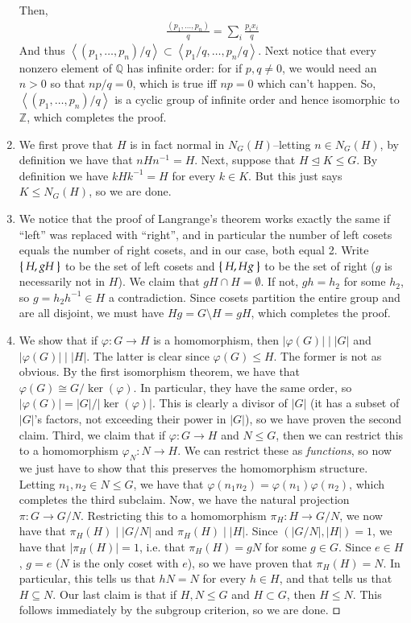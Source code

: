 \documentclass[12pt]{article}
\theoremstyle{definitionstyle}
\def\mbb#1{\mathbb{#1}}
\def \cph{\varphi}
\renewcommand{\qed}{$\hfill\square$}
\newcommand{\Z}{\mbb Z}
\newcommand{\gen}[1]{\left\langle #1 \right\rangle}
\newcommand{\nsg}{\trianglelefteq}
\begin{document}
\begin{enumerate}[leftmargin=\labelsep]
		Then,
		\begin{align*}
			\frac{(p_1, \ldots, p_n)}{q} = \sum_i \frac{p_ix_i}{q}
		\end{align*}
		And thus $\gen{(p_1, \ldots, p_n)/q} \subset \gen{p_1/q, \ldots, p_n/q}$. Next notice that every nonzero element of $\mbb Q$ has infinite order: for if $p, q \neq 0$, we would need an $n > 0$ so that $np/q = 0$, which is true iff $np = 0$ which can't happen. So, $\gen{(p_1, \ldots, p_n)/q}$ is a cyclic group of infinite order and hence isomorphic to $\Z$, which completes the proof.
		
		\item We first prove that $H$ is in fact normal in $N_G(H)$--letting $n \in N_G(H)$, by definition we have that $nHn^{-1} = H$. Next, suppose that $H \nsg K \leq G$. By definition we have $kHk^{-1} = H$ for every $k \in K$. But this just says $K \leq N_G(H)$, so we are done.
		
		\item We notice that the proof of Langrange's theorem works exactly the same if ``left'' was replaced with ``right'', and in particular the number of left cosets equals the number of right cosets, and in our case, both equal 2. Write $\Set{H, gH}$ to be the set of left cosets and $\Set{H, Hg}$ to be the set of right ($g$ is necessarily not in $H$). We claim that $gH \cap H = \emptyset$. If not, $gh = h_2$ for some $h_2$, so $g = h_2h^{-1}\in H$ a contradiction. Since cosets partition the entire group and are all disjoint, we must have $Hg = G \setminus H = gH$, which completes the proof.
		
		\item We show that if $\cph: G \to H$ is a homomorphism, then $|\cph(G)| \mid |G|$ and $|\cph(G)| \mid |H|$. The latter is clear since $\cph(G) \leq H$. The former is not as obvious. By the first isomorphism theorem, we have that $\cph(G) \cong G/\ker(\cph)$. In particular, they have the same order, so $|\cph(G)| = |G|/|\ker(\cph)|$. This is clearly a divisor of $|G|$ (it has a subset of $|G|$'s factors, not exceeding their power in $|G|$), so we have proven the second claim. Third, we claim that if $\cph: G \to H$ and $N \leq G$, then we can restrict this to a homomorphism $\cph_N: N \to H$. We can restrict these as \textit{functions}, so now we just have to show that this preserves the homomorphism structure. Letting $n_1, n_2 \in N \leq G$, we have that $\cph(n_1 n_2) = \cph(n_1) \cph(n_2)$, which completes the third subclaim. Now, we have the natural projection $\pi: G \to G/N$. Restricting this to a homomorphism $\pi_H: H \to G/N$, we now have that $\pi_H(H) \mid |G/N|$ and $\pi_H(H) \mid |H|$. Since $(|G/N|, |H|) = 1$, we have that $|\pi_H(H)| = 1$, i.e. that $\pi_H(H) = gN$ for some $g \in G$. Since $e \in H$, $g = e$ ($N$ is the only coset with $e$), so we have proven that $\pi_H(H) = N$. In particular, this tells us that $hN = N$ for every $h \in H$, and that tells us that $H \subseteq N$. Our last claim is that if $H, N \leq G$ and $H \subset G$, then $H \leq N$. This follows immediately by the subgroup criterion, so we are done. \qed
		

\end{enumerate}
\end{document}

